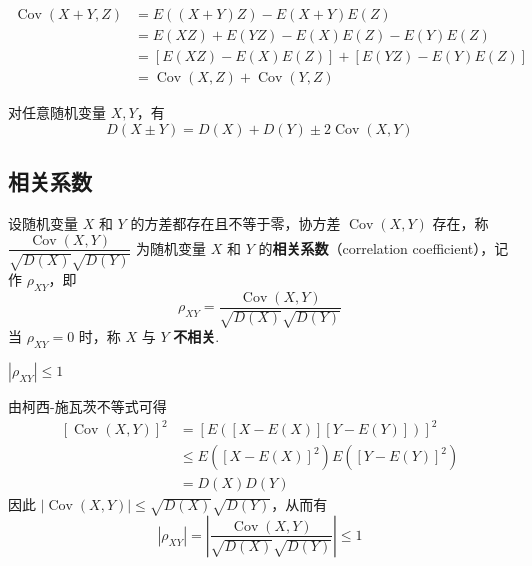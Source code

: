 \begin{myproof}
    $$
    \begin{aligned}
        \operatorname{Cov}(X+Y,Z) &= E((X+Y)Z) - E(X+Y) E(Z) \\
        &= E(XZ) + E(YZ) - E(X) E(Z) - E(Y) E(Z) \\
        &= [E(XZ) - E(X) E(Z)] + [E(YZ) - E(Y) E(Z)] \\
        &= \operatorname{Cov}(X,Z) + \operatorname{Cov}(Y,Z)
    \end{aligned}
    $$
\end{myproof}

\begin{property}
    对任意随机变量 $X,Y$，有
    $$
    D(X \pm Y) = D(X) + D(Y) \pm 2 \operatorname{Cov}(X,Y)
    $$
\end{property}

\subsection{相关系数}

\begin{definition}
    设随机变量 $X$ 和 $Y$ 的方差都存在且不等于零，协方差 $\operatorname{Cov}(X,Y)$ 存在，称 $\dfrac{\operatorname{Cov}(X,Y)}{\sqrt{D(X)} \sqrt{D(Y)}}$ 为随机变量 $X$ 和 $Y$ 的\textbf{相关系数}（correlation coefficient），记作 $\rho_{XY}$，即
    $$
    \rho_{XY} = \dfrac{\operatorname{Cov}(X,Y)}{\sqrt{D(X)} \sqrt{D(Y)}}
    $$
    当 $\rho_{XY} = 0$ 时，称 $X$ 与 $Y$ \textbf{不相关}.
\end{definition}

\setcounter{propertyname}{0}

\begin{property}
    $|\rho_{XY}| \leqslant 1$
\end{property}

\vspace{-1.5em}

\begin{myproof}
    由柯西-施瓦茨不等式可得
    $$
    \begin{aligned}
        \left[ \operatorname{Cov}(X,Y) \right]^2 &= [E([X-E(X)][Y-E(Y)])]^2 \\
        & \leqslant E([X-E(X)]^2) E([Y-E(Y)]^2) \\
        &= D(X) D(Y)
    \end{aligned}
    $$
    因此 $|\operatorname{Cov}(X,Y)| \leqslant \sqrt{D(X)} \sqrt{D(Y)}$，从而有
    $$
    |\rho_{XY}| = \left| \dfrac{\operatorname{Cov}(X,Y)}{\sqrt{D(X)} \sqrt{D(Y)}} \right| \leqslant 1
    $$

    \vspace{-2.3em}
\end{myproof}

